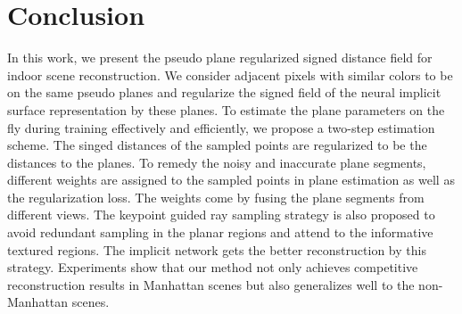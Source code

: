 \documentclass[10pt,journal,compsoc]{IEEEtran}
\begin{document}
\section{Conclusion}
\label{sec:conclusion}
In this work, we present the pseudo plane regularized signed distance field for indoor scene reconstruction. We consider adjacent pixels with similar colors to be on the same pseudo planes and regularize the signed field of the neural implicit surface representation by these planes. To estimate the plane parameters on the fly during training effectively and efficiently, we propose a two-step estimation scheme. The singed distances of the sampled points are regularized to be the distances to the planes. To remedy the noisy and inaccurate plane segments, different weights are assigned to the sampled points in plane estimation as well as the regularization loss. The weights come by fusing the plane segments from different views. The keypoint guided ray sampling strategy is also proposed to avoid redundant sampling in the planar regions and attend to the informative textured regions. The implicit network gets the better reconstruction by this strategy. Experiments show that our method not only achieves competitive reconstruction results in Manhattan scenes but also generalizes well to the non-Manhattan scenes.


%
\end{document}
